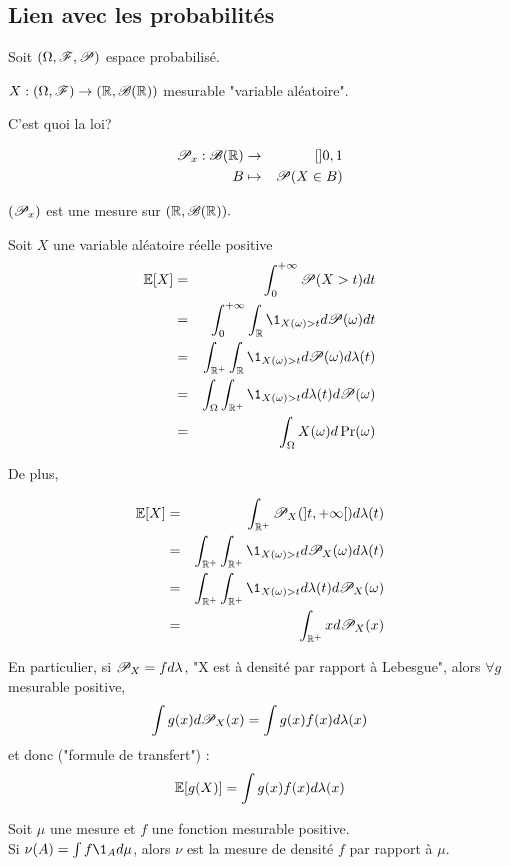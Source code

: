 \subsection{Lien avec les probabilités}




Soit $(\Omega, \mathscr{F}, \mathscr{P})$ espace probabilisé.

$X : (\Omega,    \mathscr{F}) \to (\mathbb{R},  \mathscr{B}(\mathbb{R})) $ mesurable "variable aléatoire".

C'est quoi la loi?

\begin{eqnarray*}
	\mathscr{P}_x: \mathscr{B} (\mathbb{R}) &\to& []0,1 \\
	B &\mapsto& \mathscr{P}(X  \in B)
\end{eqnarray*}

$(\mathscr{P}_x)$ est une mesure sur $(\mathbb{R},  \mathscr{B}(\mathbb{R})).$

Soit $X$ une variable aléatoire réelle positive\\
\begin{eqnarray*}
	\E[X] &=& \int_0^{+\infty} \Pro (X> t) d t\\
	&=& \int_0^{+\infty}\int_\R \1_{X(\omega)>t}d \Pro (\omega) d t\\
	&=& \int_{\R^+} \int_{\R} \1_{X(\omega)>t}d \Pro (\omega) d \lambda(t) \\ %
	&=& \int_{\Omega} \int_{\R^+} \1_{X(\omega)>t}d \lambda(t) d \Pro (\omega)  \\%
	&=& \int_{\Omega} X(\omega) d \Pr(\omega)
\end{eqnarray*}

De plus,


\begin{eqnarray*}
	\E[X] &=& \int_{\R^+} \Pro_X(]t, +\infty[) d \lambda (t) \\
	&=& \int_{\R^+} \int_{\R^+} \1_{X(\omega)>t}d \Pro_X (\omega) d \lambda(t) \\
	&=& \int_{\R^+} \int_{\R^+} \1_{X(\omega)>t}d \lambda(t) d\Pro_X (\omega)  \\ %
	&=& \int_{\R^+} x d\Pro_X (x)
\end{eqnarray*}

En particulier, si $\mathscr{P}_X = fd\lambda$, "X est à densité par rapport à Lebesgue", alors $\forall g$ mesurable positive,
$$\int g(x) d \mathscr{P}_X(x) = \int g(x) f(x) d \lambda(x)$$
et donc ("formule de transfert") :
$$ \mathbb{E}[g(X)] = \int g(x) f(x) d \lambda(x)$$

\begin{example}
	Soit $\mu$ une mesure et $f$ une fonction mesurable positive.\\
	Si $\nu(A) = \int f \1_A d \mu$, alors $\nu$ est la mesure de densité $f$ par rapport à $\mu$.
\end{example}


